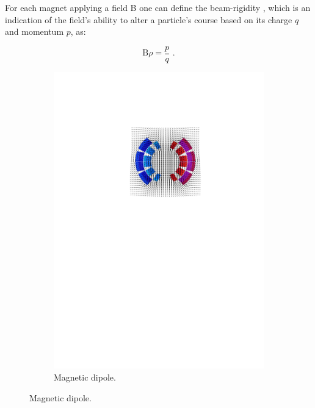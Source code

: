 For each magnet applying a field B one can define the \gls{beam-rigidity} , which is an indication of the field's ability to alter a particle's course based on its charge \(q\) and momentum \(p\), as:

\begin{equation}
    \mathrm{B} \rho = \frac{p}{q} \text{ .}
    \label{equation:magnetic_rigidity}
\end{equation}

\begin{figure}[!hbt]
    \centering
    \begin{subfigure}[b]{0.495\textwidth}
        \centering
        \includegraphics[width=\textwidth]{Figures/Beam_Dynamics_Theory/lhc_costheta_dipole.pdf}
        \caption{Magnetic dipole.}
        \label{fig:magnetic_dipole}

\end{subfigure}
\end{figure}
